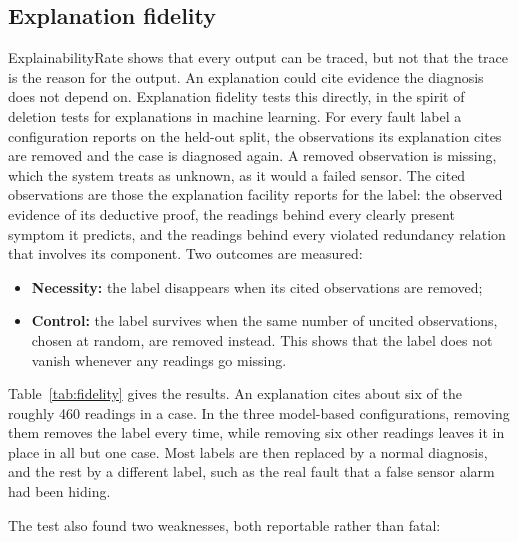 \subsection{Explanation fidelity}
\label{sec:fidelity}

ExplainabilityRate shows that every output can be traced, but not that the trace is the reason for the output. An explanation could cite evidence the diagnosis does not depend on. Explanation fidelity tests this directly, in the spirit of deletion tests for explanations in machine learning. For every fault label a configuration reports on the held-out split, the observations its explanation cites are removed and the case is diagnosed again. A removed observation is missing, which the system treats as unknown, as it would a failed sensor. The cited observations are those the explanation facility reports for the label: the observed evidence of its deductive proof, the readings behind every clearly present symptom it predicts, and the readings behind every violated redundancy relation that involves its component. Two outcomes are measured:

\begin{itemize}
  \item \textbf{Necessity:} the label disappears when its cited observations are removed;
  \item \textbf{Control:} the label survives when the same number of uncited observations, chosen at random, are removed instead. This shows that the label does not vanish whenever any readings go missing.
\end{itemize}



Table~\ref{tab:fidelity} gives the results. An explanation cites about six of the roughly 460 readings in a case. In the three model-based configurations, removing them removes the label every time, while removing six other readings leaves it in place in all but one case. Most labels are then replaced by a normal diagnosis, and the rest by a different label, such as the real fault that a false sensor alarm had been hiding.

The test also found two weaknesses, both reportable rather than fatal:

